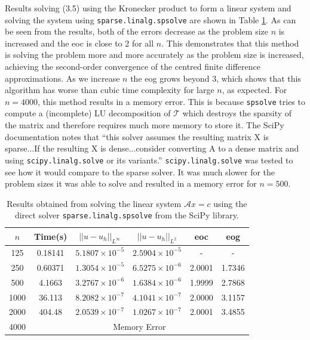 \documentclass[11pt]{article}
\numberwithin{equation}{section}
\begin{document}
Results solving (3.5) using the Kronecker product to form a linear system and solving the system using \texttt{sparse.linalg.spsolve} are shown in Table \ref{table:kron direct}. As can be seen from the results, both of the errors decrease as the problem size $n$ is increased and the eoc is close to 2 for all $n$. This demonstrates that this method is solving the problem more and more accurately as the problem size is increased, achieving the second-order convergence of the centred finite difference approximations. As we increase $n$ the eog grows beyond $3$, which shows that this algorithm has worse than cubic time complexity for large $n$, as expected. For $n=4000$, this method results in a memory error. This is because \texttt{spsolve} tries to compute a (incomplete) LU decomposition of $\mathcal{T}$ which destroys the sparsity of the matrix and therefore requires much more memory to store it. The SciPy documentation notes that ``this solver assumes the resulting matrix X is sparse...If the resulting X is dense...consider converting A to a dense matrix and using \texttt{scipy.linalg.solve} or its variants.'' \texttt{scipy.linalg.solve} was tested to see how it would compare to the sparse solver. It was much slower for the problem sizes it was able to solve and resulted in a memory error for $n=500$.

\begin{table}[H]
\centering
\begin{tabular}{|c|c|c|c|c|c|}
\hline
$n$ & Time(s) & $|| u - u_h ||_{L^{\infty}}$ &$|| u - u_h ||_{L^{2}}$ & eoc & eog \\
\hline
125 & 0.18141 & $5.1807 \times 10^{-5}$ & $2.5904 \times 10^{-5}$ & - & - \\
250 & 0.60371 & $1.3054 \times 10^{-5}$ & $6.5275 \times 10^{-6}$ & 2.0001 & 1.7346 \\
500 & 4.1663 & $3.2767 \times 10^{-6}$ & $1.6384 \times 10^{-6}$ & 1.9999 & 2.7868 \\
1000 & 36.113 & $8.2082 \times 10^{-7}$ & $4.1041 \times 10^{-7}$ & 2.0000 & 3.1157 \\
2000 & 404.48 & $2.0539 \times 10^{-7}$ & $1.0267 \times 10^{-7}$ & 2.0001 & 3.4855 \\
\cline{2-6}
4000 & \multicolumn{5}{c|}{Memory Error} \\
\hline
\end{tabular}
\captionsetup{justification=centering}
\caption{Results obtained from solving the linear system $\mathcal{A} x = c$ using the direct solver  \texttt{sparse.linalg.spsolve} from the SciPy library.}
\label{table:kron direct}
\end{table}
\end{document}
